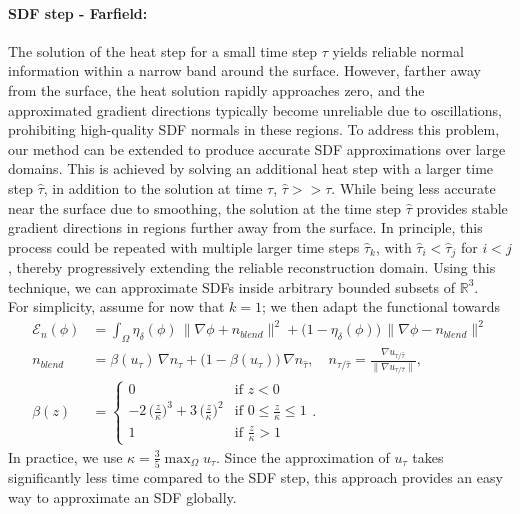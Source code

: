 \documentclass[12pt,openany]{book}
\newcommand{\R}{\mathbb{R}}
\theoremstyle{plainnormal}
\theoremstyle{remark}
\begin{document}
\paragraph{SDF step - Farfield:}
The solution of the heat step for a small time step $\tau$ yields reliable normal information within a narrow band around the surface. However, farther away from the surface, the heat solution rapidly approaches zero, and the approximated gradient directions typically become unreliable due to oscillations, prohibiting high-quality SDF normals in these regions. To address this problem, our method can be extended to produce accurate SDF approximations over large domains. This is achieved by solving an additional heat step with a larger time step $\hat{\tau}$, in addition to the solution at time $\tau$, $\hat \tau >> \tau$. While being less accurate near the surface due to smoothing, the solution at the time step $\hat \tau$ provides stable gradient directions in regions further away from the surface. In principle, this process could be repeated with multiple larger time steps $\hat{\tau}_k$, with $\hat{\tau}_i < \hat{\tau}_j$ for $i < j$, thereby progressively extending the reliable reconstruction domain. Using this technique, we can approximate SDFs inside arbitrary bounded subsets of $\R^3$.\\
For simplicity, assume for now that $k = 1$; we then adapt the functional towards 
\begin{align*}
    \mathcal{E}_n (\phi)&= \int_\Omega \eta_\delta(\phi)\, \|\nabla \phi + n_{blend}\|^2 + \big(1 - \eta_\delta(\phi)\big)\,\|\nabla \phi - n_{blend}\|^2 \\  n_{blend} &= \beta(u_\tau)\, \nabla n_\tau + \big(1-\beta(u_\tau)\big)\,\nabla n_{\hat \tau}, \quad n_{\tau/ \hat \tau} = \frac{\nabla u_{\tau/ \hat \tau}}{\|\nabla u_{\tau/ \hat \tau}\|}, \\\beta(z) &= \begin{cases}
0 & \text{if } z < 0 \\
-2\,\big(\frac{z}{\kappa}\big)^3 + 3\, \big(\frac{z}{\kappa}\big)^2 & \text{if } 0 \leq \frac{z}{\kappa} \leq 1 \\
1 & \text{if } \frac{z}{\kappa} > 1
\end{cases}.
\end{align*} 
In practice, we use $\kappa = \frac{3}{5} \max_\Omega u_\tau $. Since the approximation of $u_\tau$ takes significantly less time compared to the SDF step, this approach provides an easy way to approximate an SDF globally.\\
\end{document}
